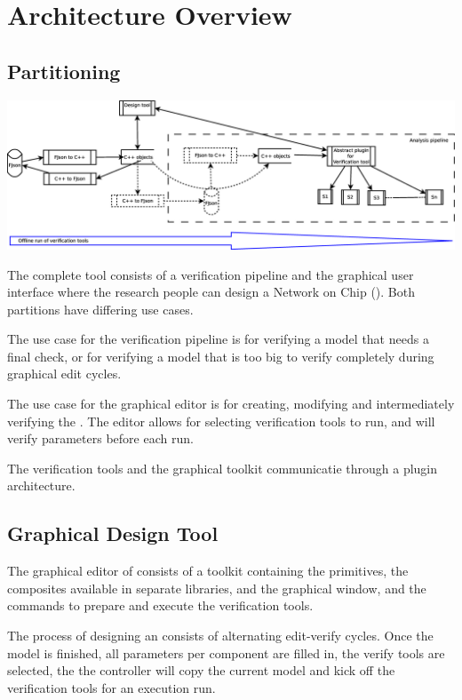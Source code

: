 \chapter{Architecture Overview}

\section{Partitioning}

\begin{center}
	\includegraphics[width=.9\linewidth]{architecture-tool-scope}
\end{center}

The complete tool consists of a verification pipeline and
the graphical user interface where the research people
can design a Network on Chip (\Noc). Both partitions have differing
use cases. 

The use case for the verification pipeline is for verifying a model 
that needs a final check, or for verifying a model that is too 
big to verify completely during graphical edit cycles.

The use case for the graphical editor is for creating, modifying 
and intermediately verifying the \Noc. The editor allows for 
selecting verification tools to run, and will verify parameters
before each run.

The verification tools and the graphical toolkit communicatie 
through a plugin architecture.

\section{Graphical Design Tool}

The graphical editor of \Noc consists of a toolkit containing
the \xmas primitives, the composites available in separate 
libraries, and the graphical window, and the commands to 
prepare and execute the verification tools.

The process of designing an \Noc consists of alternating edit-verify cycles.
Once the model is finished, all parameters per component are filled in, the 
verify tools are selected, the the controller will copy the current model and
kick off the verification tools for an execution run.

